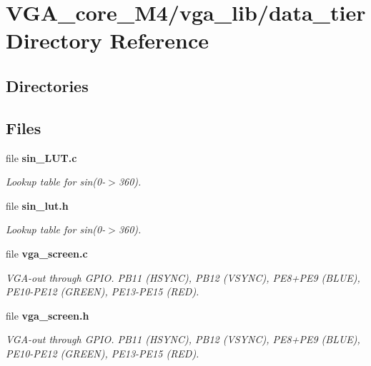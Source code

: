\section{V\+G\+A\+\_\+core\+\_\+\+M4/vga\+\_\+lib/data\+\_\+tier Directory Reference}
\label{dir_f590540eb3d7ea0602e1ad184daa0ca8}
\subsection*{Directories}
\begin{DoxyCompactItemize}
\end{DoxyCompactItemize}
\subsection*{Files}
\begin{DoxyCompactItemize}
\item 
file {\bf sin\+\_\+\+L\+U\+T.\+c}
\begin{DoxyCompactList}\small\item\em Lookup table for sin(0-\/$>$360). \end{DoxyCompactList}\item 
file {\bf sin\+\_\+lut.\+h}
\begin{DoxyCompactList}\small\item\em Lookup table for sin(0-\/$>$360). \end{DoxyCompactList}\item 
file {\bf vga\+\_\+screen.\+c}
\begin{DoxyCompactList}\small\item\em V\+G\+A-\/out through G\+P\+IO. P\+B11 (H\+S\+Y\+NC), P\+B12 (V\+S\+Y\+NC), P\+E8+\+P\+E9 (B\+L\+UE), P\+E10-\/\+P\+E12 (G\+R\+E\+EN), P\+E13-\/\+P\+E15 (R\+ED). \end{DoxyCompactList}\item 
file {\bf vga\+\_\+screen.\+h}
\begin{DoxyCompactList}\small\item\em V\+G\+A-\/out through G\+P\+IO. P\+B11 (H\+S\+Y\+NC), P\+B12 (V\+S\+Y\+NC), P\+E8+\+P\+E9 (B\+L\+UE), P\+E10-\/\+P\+E12 (G\+R\+E\+EN), P\+E13-\/\+P\+E15 (R\+ED). \end{DoxyCompactList}\end{DoxyCompactItemize}
